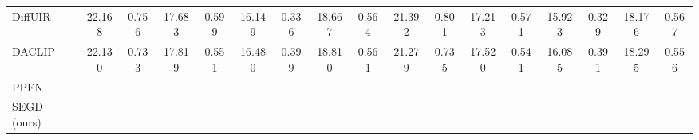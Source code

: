 \begin{table}[t]
\begin{threeparttable}
\begin{tabularx}{\linewidth}{l|cc|cc|cc|cc|cc|cc|cc|cc}
        DiffUIR~\cite{zheng2024selective}&\footnotesize 22.168& \footnotesize 0.756&\footnotesize 17.683& \footnotesize 0.599&\footnotesize 16.149&\footnotesize 0.336&\footnotesize 18.667&\footnotesize 0.564&\footnotesize 21.392 &\footnotesize 0.801 &\footnotesize 17.213 &\footnotesize 0.571&\footnotesize 15.923 &\footnotesize 0.329 &\footnotesize 18.176 &\footnotesize 0.567\\
        DACLIP~\cite{DACLIP2024}&\footnotesize 22.130& \footnotesize 0.733&\footnotesize 17.819& \footnotesize 0.551&\footnotesize 16.480&\footnotesize 0.399&\footnotesize 18.810&\footnotesize 0.561&\footnotesize 21.279 &\footnotesize  0.735 &\footnotesize 17.520 &\footnotesize 0.541&\footnotesize 16.085 &\footnotesize 0.391 &\footnotesize 18.295 &\footnotesize 0.556\\
        PPFN~\cite{liu2025enhancing}&\footnotesize \cellcolor[HTML]{d9e7f4}{\strut 31.121}& \footnotesize \cellcolor[HTML]{d9e7f4}{\strut 0.937}&\footnotesize \cellcolor[HTML]{d9e7f4}{\strut 23.761}& \footnotesize \cellcolor[HTML]{d9e7f4}{\strut 0.825}&\footnotesize \cellcolor[HTML]{d9e7f4}{\strut 18.201}&\footnotesize \cellcolor[HTML]{d9e7f4}{\strut 0.724}&\footnotesize \cellcolor[HTML]{d9e7f4}{\strut 24.361}&\footnotesize \cellcolor[HTML]{d9e7f4}{0.829}&\footnotesize \cellcolor[HTML]{ffc7ce}{27.016}& \footnotesize \cellcolor[HTML]{d9e7f4}{0.919}&\footnotesize \cellcolor[HTML]{d9e7f4}{21.010}& \footnotesize \cellcolor[HTML]{d9e7f4}{0.794}&\footnotesize \cellcolor[HTML]{d9e7f4}{17.762}&\footnotesize \cellcolor[HTML]{d9e7f4}{0.704} &\footnotesize \cellcolor[HTML]{d9e7f4}{21.929} &\footnotesize \cellcolor[HTML]{d9e7f4}{0.806}\\
        SEGD (ours)&\footnotesize \cellcolor[HTML]{ffc7ce}{\strut 31.601}& \footnotesize  \cellcolor[HTML]{ffc7ce}{\strut 0.951}&\footnotesize  \cellcolor[HTML]{ffc7ce}{\strut 26.342}& \footnotesize  \cellcolor[HTML]{ffc7ce}{\strut 0.872}&\footnotesize  \cellcolor[HTML]{ffc7ce}{\strut 20.310}&\footnotesize  \cellcolor[HTML]{ffc7ce}{\strut 0.761}&\footnotesize  \cellcolor[HTML]{ffc7ce}{\strut 26.085}&\footnotesize  \cellcolor[HTML]{ffc7ce}{\strut 0.862}&\footnotesize  \cellcolor[HTML]{d9e7f4}{\strut 26.789} &\footnotesize  \cellcolor[HTML]{ffc7ce}{\strut 0.922} &\footnotesize  \cellcolor[HTML]{ffc7ce}{\strut 22.323} &\footnotesize  \cellcolor[HTML]{ffc7ce}{\strut 0.842}&\footnotesize  \cellcolor[HTML]{ffc7ce}{\strut 18.312} &\footnotesize  \cellcolor[HTML]{ffc7ce}{\strut 0.737} &\footnotesize  \cellcolor[HTML]{ffc7ce}{\strut 22.475} &\footnotesize  \cellcolor[HTML]{ffc7ce}{\strut 0.834}\\
        \bottomrule
        \end{tabularx}
    \end{threeparttable}\vspace{-1mm}
\end{table}

